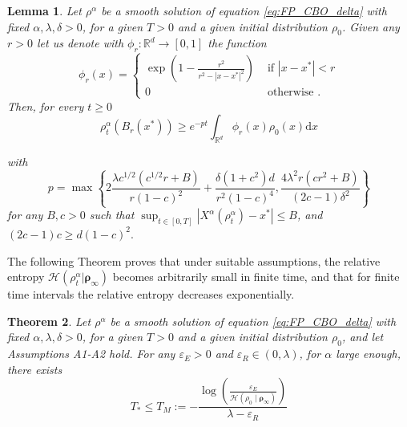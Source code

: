 \documentclass[reqno]{amsart}
\numberwithin{algorithm}{section}
\newcommand{\diff}{\mathrm{d}}
\newcommand{\R}{\mathbb{R}}
\newtheorem{theorem}{Theorem}[section]
\newtheorem{lemma}[theorem]{Lemma}
\begin{document}
{\begin{lemma}
Let {$\rho^\alpha$ %
be a %
smooth solution of equation \eqref{eq:FP_CBO_delta}} with fixed $\alpha,\lambda,\delta>0$, for a given $T>0$ and a given initial distribution $\rho_0$. Given any $r>0$ let us denote with $\phi_r:\R^d\longrightarrow[0,1]$ the function 
$$\phi_r(x) = \begin{cases}
    \exp\left(1-\frac{r^2}{r^2- |x-x^*|^2}\right) & \text{ if }  |x-x^*|<r\\
    0 & \text{ otherwise .}
\end{cases}$$
Then, for every $t\geq 0$ 
    \begin{equation}
        \rho^\alpha_t(B_r(x^*))\geq e^{-pt}\int_{\mathbb{R}^d}\phi_r(x)\rho_0(x)\diff x
    \end{equation}

with $$p =\max\left\{2\frac{\lambda c^{1/2}(c^{1/2}r+B)}{r(1-c)^2}+\frac{\delta(1+c^2)d}{r^2(1-c)^4}, \frac{4\lambda^2r(cr^2+B)}{(2c-1)\delta^2}\right\}$$
for any $B,c>0$ such that $\sup_{t\in[0,T]}|X^\alpha(\rho^\alpha_t)-x^*|\leq B$, and $(2c-1)c\geq d(1-c)^2.$
\end{lemma}


The following Theorem proves that under suitable assumptions, the relative entropy $\mathcal H(\rho^\alpha_t|\boldsymbol\rho_\infty)$ becomes arbitrarily small in finite time, and that for finite time intervals the relative entropy decreases exponentially. 
\begin{theorem}\label{thm:exponential_decay}
   Let {$\rho^\alpha$ %
be a %
smooth solution of equation \eqref{eq:FP_CBO_delta}} with fixed $\alpha,\lambda,\delta>0$, for a given $T>0$ and a given initial distribution $\rho_0$, and let Assumptions A1-A2 hold. For any $\varepsilon_E > 0$ and $\varepsilon_R \in (0, \lambda)$, for $\alpha$ large enough, there exists 
    $$T_*\leq T_M:= -\frac{\log\left(\frac{\varepsilon_E}{\mathcal H(\rho_0 \mid \boldsymbol\rho_\infty)}\right)}{\lambda - \varepsilon_R}$$
    

\end{theorem}}
\end{document}
